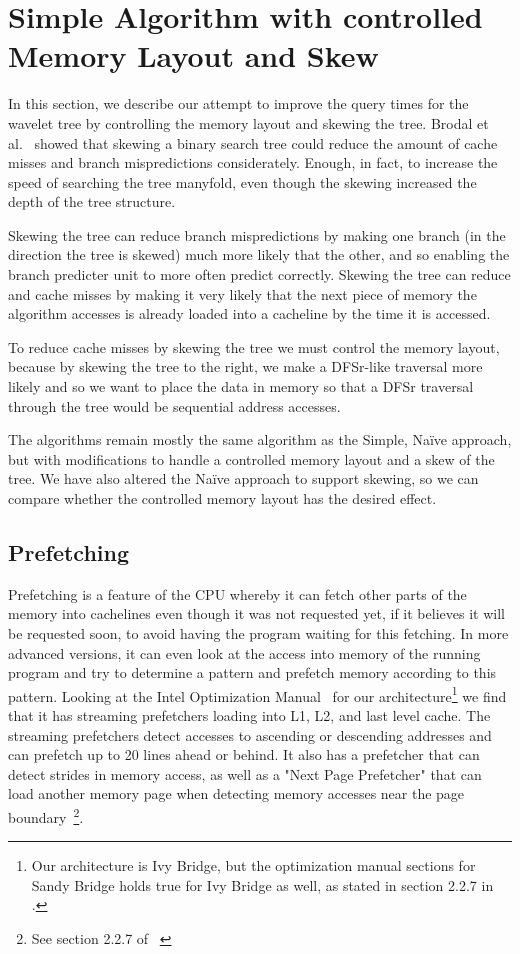 \section{Simple Algorithm with controlled Memory Layout and Skew}
\label{sec:memorylayout}
In this section, we describe our attempt to improve the query times for the wavelet tree by controlling the memory layout and skewing the tree.
Brodal et al.~\cite{gerthSkewedBinarySearchTrees} showed that skewing a binary search tree could reduce the amount of cache misses and branch mispredictions considerately. Enough, in fact, to increase the speed of searching the tree manyfold, even though the skewing increased the depth of the tree structure.

Skewing the tree can reduce branch mispredictions by making one branch (in the direction the tree is skewed) much more likely that the other, and so enabling the branch predicter unit to more often predict correctly. 
Skewing the tree can reduce and cache misses by making it very likely that the next piece of memory the algorithm accesses is already loaded into a cacheline by the time it is accessed.

To reduce cache misses by skewing the tree we must control the memory layout, because by skewing the tree to the right, we make a DFSr-like traversal more likely and so we want to place the data in memory so that a DFSr traversal through the tree would be sequential address accesses. 

The algorithms remain mostly the same algorithm as the Simple, Naïve approach, but with modifications to handle a controlled memory layout and a skew of the tree.
We have also altered the Naïve approach to support skewing, so we can compare whether the controlled memory layout has the desired effect.

\subsection{Prefetching}
Prefetching is a feature of the CPU whereby it can fetch other parts of the memory into cachelines even though it was not requested yet, if it believes it will be requested soon, to avoid having the program waiting for this fetching.
In more advanced versions, it can even look at the access into memory of the running program and try to determine a pattern and prefetch memory according to this pattern.
Looking at the Intel Optimization Manual~\cite{intel-optimization-manual} for our architecture\footnote{Our architecture is Ivy Bridge, but the optimization manual sections for Sandy Bridge holds true for Ivy Bridge as well, as stated in section 2.2.7 in \cite{intel-optimization-manual}.} we find that it has streaming prefetchers loading into L1, L2, and last level cache. The streaming prefetchers detect accesses to ascending or descending addresses and can prefetch up to 20 lines ahead or behind. It also has a prefetcher that can detect strides in memory access, as well as a "Next Page Prefetcher" that can load another memory page when detecting memory accesses near the page boundary~\footnote{See section 2.2.7 of ~\cite{intel-optimization-manual}}.


